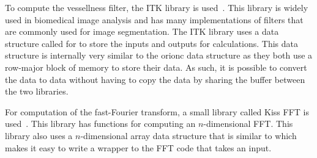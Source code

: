 To compute the vessellness filter, the ITK library is
used~\autocite{Ibanez:2012:ITK}. This library is widely used in biomedical
image analysis and has many implementations of filters that are commonly used
for image segmentation. The ITK library uses a data structure called
 for to store the inputs and outputs for calculations.
This data structure is internally very similar to the \gls{orionc}
 data structure as they both use a row-major block of
memory to store their data. As such, it is possible to convert the
 data to  data without having
to copy the data by sharing the buffer between the two libraries.

For computation of the fast-Fourier transform, a small library called Kiss FFT
is used~\autocite{kissfft}. This library has functions for computing an
\(n\)-dimensional \gls{FFT}. This library also uses a \(n\)-dimensional array data
structure that is similar to  which makes it easy to
write a wrapper to the \gls{FFT} code that takes an  input.
